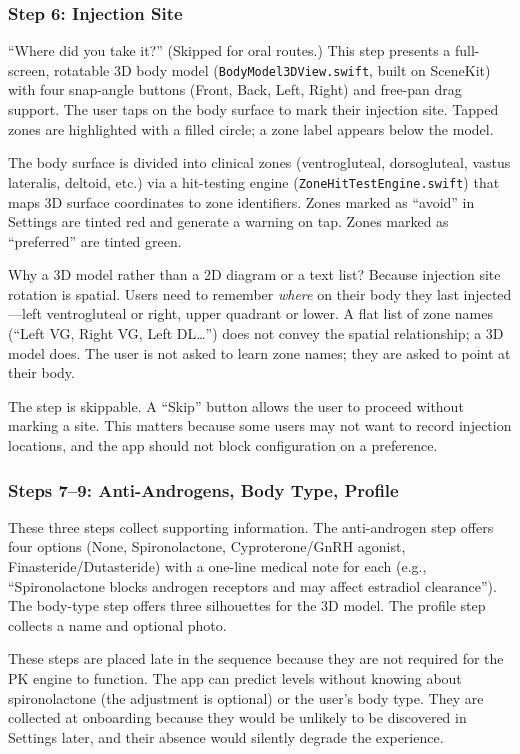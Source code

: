 \documentclass[11pt,a4paper]{article}
\newcommand{\code}[1]{\texttt{\small #1}}
\begin{document}
\subsubsection{Step 6: Injection Site}

``Where did you take it?'' (Skipped for oral routes.) This step presents a
full-screen, rotatable 3D body model (\code{BodyModel3DView.swift},
built on SceneKit) with four snap-angle buttons (Front, Back, Left,
Right) and free-pan drag support. The user taps on the body surface to
mark their injection site. Tapped zones are highlighted with a filled
circle; a zone label appears below the model.

The body surface is divided into clinical zones (ventrogluteal,
dorsogluteal, vastus lateralis, deltoid, etc.) via a hit-testing engine
(\code{ZoneHitTestEngine.swift}) that maps 3D surface coordinates to zone
identifiers. Zones marked as ``avoid'' in Settings are tinted red and
generate a warning on tap. Zones marked as ``preferred'' are tinted
green.

Why a 3D model rather than a 2D diagram or a text list? Because injection
site rotation is spatial. Users need to remember \emph{where} on their
body they last injected---left ventrogluteal or right, upper quadrant or
lower. A flat list of zone names (``Left VG, Right VG, Left DL\dots'')
does not convey the spatial relationship; a 3D model does. The user is
not asked to learn zone names; they are asked to point at their body.

The step is skippable. A ``Skip'' button allows the user to proceed
without marking a site. This matters because some users may not want to
record injection locations, and the app should not block configuration on
a preference.

\subsubsection{Steps 7--9: Anti-Androgens, Body Type, Profile}

These three steps collect supporting information. The anti-androgen step
offers four options (None, Spironolactone, Cyproterone/GnRH agonist,
Finasteride/Dutasteride) with a one-line medical note for each (e.g.,
``Spironolactone blocks androgen receptors and may affect estradiol
clearance''). The body-type step offers three silhouettes for the 3D
model. The profile step collects a name and optional photo.

These steps are placed late in the sequence because they are not required
for the PK engine to function. The app can predict levels without knowing
about spironolactone (the adjustment is optional) or the user's body
type. They are collected at onboarding because they would be unlikely to
be discovered in Settings later, and their absence would silently degrade
the experience.
\end{document}
